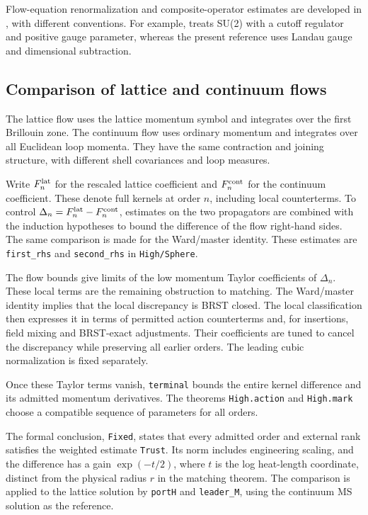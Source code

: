 \documentclass[11pt]{article}
\newcommand{\code}[1]{{\small\nolinkurl{#1}}}
\begin{document}
Flow-equation renormalization and composite-operator estimates are developed
in \cite{egk,fhh,fh}, with different conventions. For example, \cite{egk} treats SU(2)
with a cutoff regulator and positive gauge parameter, whereas the present
reference uses Landau gauge and dimensional subtraction.

\subsection{Comparison of lattice and continuum flows}
\label{sec:lattice-flow}

The lattice flow uses the lattice momentum symbol and integrates over the
first Brillouin zone. The continuum flow uses ordinary momentum and
integrates over all Euclidean loop momenta. They have the same contraction
and joining structure, with different shell covariances and loop measures.

Write $F^{\rm lat}_n$ for the rescaled lattice coefficient and
$F^{\rm cont}_n$ for the continuum coefficient. These denote full kernels
at order $n$, including local counterterms. To control
$\Delta_n=F^{\rm lat}_n-F^{\rm cont}_n$, estimates on the two propagators
are combined with the induction hypotheses to bound the difference of the
flow right-hand sides. The same comparison is made for the Ward/master
identity. These estimates are \code{first_rhs} and \code{second_rhs} in
\code{High/Sphere}.

The flow bounds give limits of the low momentum Taylor coefficients of
$\Delta_n$. These local terms are the remaining obstruction to matching.
The Ward/master identity implies that the local discrepancy is BRST closed.
The local classification then expresses it in terms of permitted action
counterterms and, for insertions, field mixing and BRST-exact adjustments.
Their coefficients are tuned to cancel the discrepancy while preserving
all earlier orders. The leading cubic normalization is fixed separately.

Once these Taylor terms vanish, \code{terminal} bounds the entire kernel
difference and its admitted momentum derivatives. The theorems
\code{High.action} and \code{High.mark} choose a compatible sequence of
parameters for all orders.

The formal conclusion, \code{Fixed}, states that every admitted order and
external rank satisfies the weighted estimate \code{Trust}. Its norm
includes engineering scaling, and the difference has a gain
$\exp(-t/2)$, where $t$ is the log heat-length coordinate, distinct from the
physical radius $r$ in the matching theorem. The comparison is applied to the lattice solution by
\code{portH} and \code{leader_M}, using the continuum MS solution as the
reference.
\end{document}
